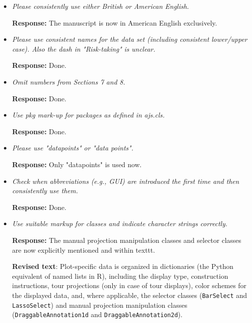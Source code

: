 \documentclass[12pt]{article}
\begin{document}
\begin{itemize}
    \textbf{Response:} The analysis has been performed again without deletion of the duplicates.
    
\subsection*{Stylistic issues}    
    
    \item \textit{Please consistently use either British or American English.}

    \textbf{Response:} The manuscript is now in American English exclusively.
    
    \item \textit{Please use consistent names for the data set (including consistent lower/upper case). Also the dash in "Risk-taking" is unclear.}

    \textbf{Response:} Done.
    
    \item \textit{Omit numbers from Sections 7 and 8.}

    \textbf{Response:} Done.
    
    \item \textit{Use pkg{} mark-up for packages as defined in ajs.cls.}

    \textbf{Response:} Done.
    
    \item \textit{Please use "datapoints" or "data points".}

    \textbf{Response:} Only "datapoints" is used now.
    
    \item \textit{Check when abbreviations (e.g., GUI) are introduced the first time and then consistently use them.}

    \textbf{Response:} Done.
    
    \item \textit{Use suitable markup for classes and indicate character strings correctly.}

    \textbf{Response:} The manual projection manipulation classes and selector classes are now explicitly mentioned and within texttt{}. 

    \textbf{Revised text}: Plot-specific data is organized in dictionaries (the Python equivalent of named lists in R), including the display type, construction instructions, tour projections (only in case of tour displays), color schemes for the displayed data, and, where applicable, the selector classes (\texttt{BarSelect} and \texttt{LassoSelect}) and manual projection manipulation classes (\texttt{DraggableAnnotation1d} and \texttt{DraggableAnnotation2d}).  
    

\end{itemize}
\end{document}

